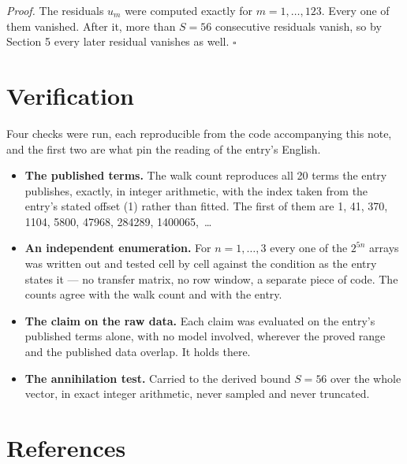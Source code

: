 \documentclass[11pt]{article}
\theoremstyle{definition}
\begin{document}
{\itshape Proof.} The residuals $u_m$ were computed exactly for $m = 1,\dots,123$. Every one of them vanished. After it, more than $S = 56$ consecutive residuals vanish, so by Section 5 every later residual vanishes as well. $\square$

\section{Verification}

Four checks were run, each reproducible from the code accompanying this note, and the first two are what pin the reading of the entry's English.

\begin{itemize}

\item {\bfseries The published terms.} The walk count reproduces all 20 terms the entry publishes, exactly, in integer arithmetic, with the index taken from the entry's stated offset (1) rather than fitted. The first of them are 1, 41, 370, 1104, 5800, 47968, 284289, 1400065,~\dots

\item {\bfseries An independent enumeration.} For $n = 1,\dots,3$ every one of the $2^{5n}$ arrays was written out and tested cell by cell against the condition as the entry states it --- no transfer matrix, no row window, a separate piece of code. The counts agree with the walk count and with the entry.

\item {\bfseries The claim on the raw data.} Each claim was evaluated on the entry's published terms alone, with no model involved, wherever the proved range and the published data overlap. It holds there.

\item {\bfseries The annihilation test.} Carried to the derived bound $S = 56$ over the whole vector, in exact integer arithmetic, never sampled and never truncated.

\end{itemize}

\section{References}
\end{document}
